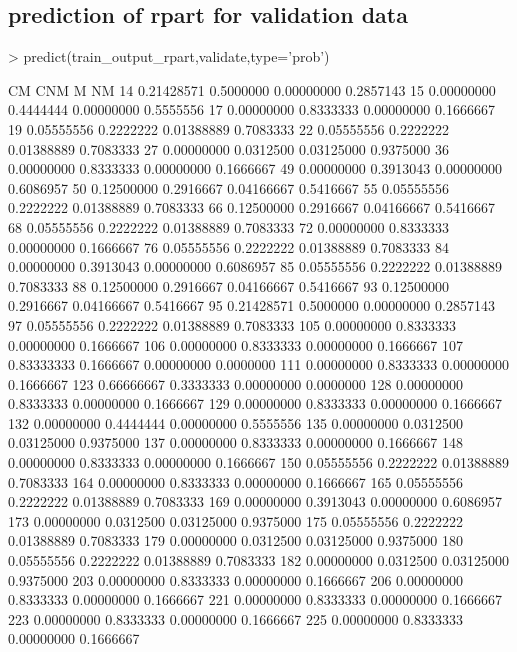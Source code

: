\documentclass{article}
\begin{document}
\subsection*{prediction of rpart for validation data}
\begin{Schunk}
\begin{Sinput}
> predict(train_output_rpart,validate,type='prob')
\end{Sinput}
\begin{Soutput}
            CM       CNM          M        NM
14  0.21428571 0.5000000 0.00000000 0.2857143
15  0.00000000 0.4444444 0.00000000 0.5555556
17  0.00000000 0.8333333 0.00000000 0.1666667
19  0.05555556 0.2222222 0.01388889 0.7083333
22  0.05555556 0.2222222 0.01388889 0.7083333
27  0.00000000 0.0312500 0.03125000 0.9375000
36  0.00000000 0.8333333 0.00000000 0.1666667
49  0.00000000 0.3913043 0.00000000 0.6086957
50  0.12500000 0.2916667 0.04166667 0.5416667
55  0.05555556 0.2222222 0.01388889 0.7083333
66  0.12500000 0.2916667 0.04166667 0.5416667
68  0.05555556 0.2222222 0.01388889 0.7083333
72  0.00000000 0.8333333 0.00000000 0.1666667
76  0.05555556 0.2222222 0.01388889 0.7083333
84  0.00000000 0.3913043 0.00000000 0.6086957
85  0.05555556 0.2222222 0.01388889 0.7083333
88  0.12500000 0.2916667 0.04166667 0.5416667
93  0.12500000 0.2916667 0.04166667 0.5416667
95  0.21428571 0.5000000 0.00000000 0.2857143
97  0.05555556 0.2222222 0.01388889 0.7083333
105 0.00000000 0.8333333 0.00000000 0.1666667
106 0.00000000 0.8333333 0.00000000 0.1666667
107 0.83333333 0.1666667 0.00000000 0.0000000
111 0.00000000 0.8333333 0.00000000 0.1666667
123 0.66666667 0.3333333 0.00000000 0.0000000
128 0.00000000 0.8333333 0.00000000 0.1666667
129 0.00000000 0.8333333 0.00000000 0.1666667
132 0.00000000 0.4444444 0.00000000 0.5555556
135 0.00000000 0.0312500 0.03125000 0.9375000
137 0.00000000 0.8333333 0.00000000 0.1666667
148 0.00000000 0.8333333 0.00000000 0.1666667
150 0.05555556 0.2222222 0.01388889 0.7083333
164 0.00000000 0.8333333 0.00000000 0.1666667
165 0.05555556 0.2222222 0.01388889 0.7083333
169 0.00000000 0.3913043 0.00000000 0.6086957
173 0.00000000 0.0312500 0.03125000 0.9375000
175 0.05555556 0.2222222 0.01388889 0.7083333
179 0.00000000 0.0312500 0.03125000 0.9375000
180 0.05555556 0.2222222 0.01388889 0.7083333
182 0.00000000 0.0312500 0.03125000 0.9375000
203 0.00000000 0.8333333 0.00000000 0.1666667
206 0.00000000 0.8333333 0.00000000 0.1666667
221 0.00000000 0.8333333 0.00000000 0.1666667
223 0.00000000 0.8333333 0.00000000 0.1666667
225 0.00000000 0.8333333 0.00000000 0.1666667

\end{Soutput}
\end{Schunk}
\end{document}
